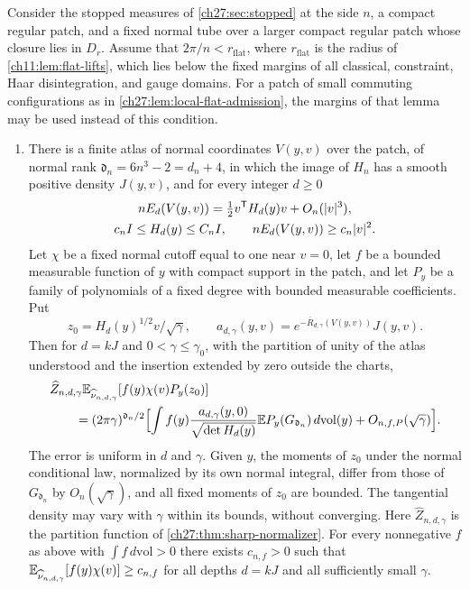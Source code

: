 \begin{proposition}\label{ch27:lem:terminal-gaussian-telescope}
Consider the stopped measures of \cref{ch27:sec:stopped} at the side $n$, a compact regular patch, and a fixed normal tube over a larger compact regular patch whose closure lies in $D_r$. Assume that $2\pi/n<r_{\mathrm{flat}}$, where $r_{\mathrm{flat}}$ is the radius of \cref{ch11:lem:flat-lifts}, which lies below the fixed margins of all classical, constraint, Haar disintegration, and gauge domains. For a patch of small commuting configurations as in \cref{ch27:lem:local-flat-admission}, the margins of that lemma may be used instead of this condition.
\begin{enumerate}
\item There is a finite atlas of normal coordinates $V(y,v)$ over the patch, of normal rank $\mathfrak d_n=6n^3-2=d_n+4$, in which the image of $H_n$ has a smooth positive density $J(y,v)$, and for every integer $d\ge0$
\begin{gather*}
 nE_d(V(y,v))=\tfrac12v^{\mathsf T}H_d(y)v+O_n(\lvert v\rvert^3),\\
 c_nI\le H_d(y)\le C_nI,\qquad nE_d(V(y,v))\ge c_n\lvert v\rvert^2.
\end{gather*}
Let $\chi$ be a fixed normal cutoff equal to one near $v=0$, let $f$ be a bounded measurable function of $y$ with compact support in the patch, and let $P_y$ be a family of polynomials of a fixed degree with bounded measurable coefficients. Put
\[
 z_0=H_d(y)^{1/2}v/\sqrt\gamma,\qquad a_{d,\gamma}(y,v)=e^{-\overline R_{d,\gamma}(V(y,v))}J(y,v).
\]
Then for $d=kJ$ and $0<\gamma\le\gamma_0$, with the partition of unity of the atlas understood and the insertion extended by zero outside the charts,
\begin{align*}
 &\widehat Z_{n,d,\gamma}\mathbb E_{\widehat\nu_{n,d,\gamma}}[f(y)\chi(v)P_y(z_0)]\\
 &\qquad=(2\pi\gamma)^{\mathfrak d_n/2}\Bigl[\int f(y)\frac{a_{d,\gamma}(y,0)}{\sqrt{\det H_d(y)}}\mathbb E P_y(G_{\mathfrak d_n})\,d\mathrm{vol}(y)+O_{n,f,P}(\sqrt\gamma)\Bigr].
\end{align*}
The error is uniform in $d$ and $\gamma$. Given $y$, the moments of $z_0$ under the normal conditional law, normalized by its own normal integral, differ from those of $G_{\mathfrak d_n}$ by $O_n(\sqrt\gamma)$, and all fixed moments of $z_0$ are bounded. The tangential density may vary with $\gamma$ within its bounds, without converging. Here $\widehat Z_{n,d,\gamma}$ is the partition function of \cref{ch27:thm:sharp-normalizer}. For every nonnegative $f$ as above with $\int f\,d\mathrm{vol}>0$ there exists $c_{n,f}>0$ such that $\mathbb E_{\widehat\nu_{n,d,\gamma}}[f(y)\chi(v)]\ge c_{n,f}$ for all depths $d=kJ$ and all sufficiently small $\gamma$.

\end{enumerate}
\end{proposition}
